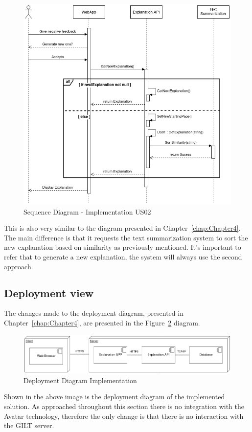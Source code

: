 \begin{figure}[H]
\centering
\includegraphics[scale=0.45]{ch5/assets/US02_SD_Implement.png}
\caption[Sequence Diagram Implementation US02]{Sequence Diagram - Implementation US02}
\label{fig:uc02Imp}
\end{figure}

This is also very similar to the diagram presented in Chapter~\ref{chap:Chapter4}.
The main difference is that it requests the text summarization system to sort the new explanation based on similarity as previously mentioned.
It's important to refer that to generate a new explanation, the system will always use the second approach.

\subsection{Deployment view}

The changes made to the deployment diagram, presented in Chapter~\ref{chap:Chapter4}, are presented in the Figure~\ref{fig:deployImp} diagram.

\begin{figure}[H]
\centering
\includegraphics[width=\textwidth,keepaspectratio]{ch5/assets/deployment_diagram_Implement.png}
\caption[Deployment Diagram Implementation]{Deployment Diagram Implementation}
\label{fig:deployImp}
\end{figure}

Shown in the above image is the deployment diagram of the implemented solution.
As approached throughout this section there is no integration with the Avatar technology, therefore the only change is that there is no interaction with the GILT server.
